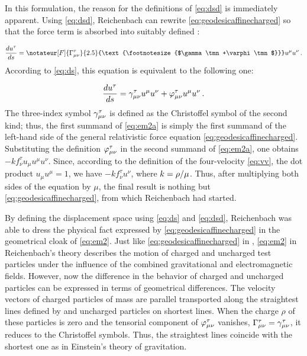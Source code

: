 \documentclass[submitted]{article}
\newcommand{\texts}[1]{\text{\footnotesize{#1}}}
\newcommand{\ctmrd}{\ensuremath{\hfrac{\rho}{\mu}}\xspace}
\begin{document}
In this formulation, the reason for the definitions of \cref{eq:dsd} is immediately apparent. Using \cref{eq:dsd}, Reichenbach can rewrite \eqref{eq:geodesicaffinecharged} so that the force term is absorbed into suitably defined \Gtmn:

\begin{equation}
\label{eq:em2} 
\frac{du^\tau}{ds} =\notateur[F]{\Gamma^{\tau}_{\mu\nu}}{2.5}{\texts{$\gamma\tmn+\varphi\tmn$}}u^\mu u^\nu\,.
\end{equation}
%
According to \cref{eq:ds}, this equation is equivalent to the following one:

\begin{equation}
\label{eq:em2a} 
\frac{du^\tau}{ds}=\gamma^{\tau}_{\mu\nu}u^\mu u^\nu+\varphi^{\tau}_{\mu\nu}u^\mu u^\nu\,.
\end{equation}
%
The three-index symbol $\gamma^\tau_{\mu\nu}$ is defined as the Christoffel symbol of the second kind; thus, the first summand of \cref{eq:em2a} is simply the first summand of the left-hand side of the general relativistic force equation \cref{eq:geodesicaffinecharged}. Substituting the definition $\varphi^\tau_{\mu\nu}$ in the second summand of \cref{eq:em2a}, one obtains $- k f_\nu^{\tau} u_\mu u^\mu u^\nu$. Since, according to the definition of the four-velocity \cref{eq:vv}, the dot product $u_\mu u^\mu=1$, we have $- k f_\nu^{\tau} u^\nu$, where $k=\ctmrd$. Thus, after multiplying both sides of the equation by $\mu$, the final result is nothing but \cref{eq:geodesicaffinecharged}, from which Reichenbach had started.

By defining the displacement space \Gtmn using \cref{eq:ds} and \cref{eq:dsd}, Reichenbach was able to dress the physical fact expressed by \cref{eq:geodesicaffinecharged} in the geometrical cloak of \cref{eq:em2}. Just like \cref{eq:geodesicaffinecharged} in \gr, \cref{eq:em2} in Reichenbach's theory describes the motion of charged and uncharged test particles under the influence of the combined gravitational and electromagnetic fields. However, now the difference in the behavior of charged and uncharged particles can be expressed in terms of geometrical differences. The velocity vectors of charged particles of mass are parallel transported along the straightest lines defined by \Gtmn and uncharged particles on shortest lines. When the charge $\rho$ of these particles is zero and the tensorial component of $\varphi^\tau_{\mu\nu}$ vanishes, $\Gamma^\tau_{\mu\nu}=\gamma^\tau_{\mu\nu}$, \ie it reduces to the Christoffel symbols. Thus, the straightest lines coincide with the shortest one as in Einstein's theory of gravitation.
\end{document}
